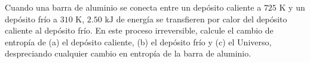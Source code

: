 \item Cuando una barra de aluminio se conecta entre un depósito caliente a $725\text{ K}$ y un depósito frío a $310\text{ K}$, $2.50\text{ kJ}$ de energía se transfieren por calor del depósito caliente al depósito frío. En este proceso irreversible, calcule el cambio de entropía de (a) el depósito caliente, (b) el depósito frío y (c) el Universo, despreciando cualquier cambio en entropía de la barra de aluminio.
